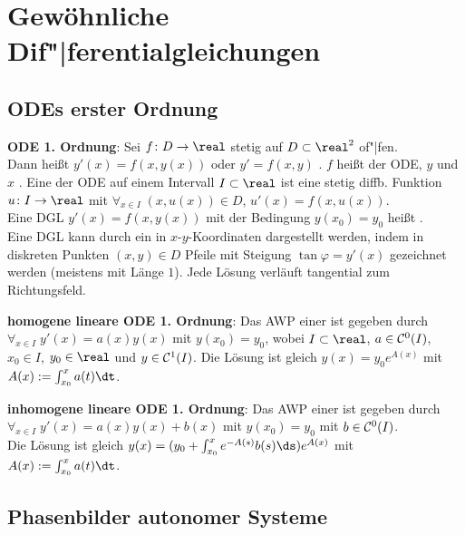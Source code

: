 \section{%
    Gewöhnliche Dif"|ferentialgleichungen%
}

\subsection{%
    ODEs erster Ordnung%
}

\textbf{ODE 1. Ordnung}:
Sei $f\colon D \to \real$ stetig auf $D \subset \real^2$ of"|fen.\\
Dann heißt $y'(x) = f(x, y(x))$ oder $y' = f(x, y)$ .
$f$ heißt  der ODE,
$y$  und $x$ .
Eine  der ODE auf einem Intervall $I \subset \real$ ist eine
stetig diffb. Funktion $u\colon I \to \real$ mit
$\forall_{x \in I}\; (x, u(x)) \in D$, $u'(x) = f(x, u(x))$.\\
Eine DGL $y'(x) = f(x, y(x))$ mit der Bedingung $y(x_0) = y_0$ heißt
.\\
Eine DGL kann durch ein  in $x$-$y$-Koordinaten dargestellt werden,
indem in diskreten Punkten $(x, y) \in D$ Pfeile mit Steigung $\tan \varphi = y'(x)$
gezeichnet werden (meistens mit Länge $1$).
Jede Lösung verläuft tangential zum Richtungsfeld.

\linie

\textbf{homogene lineare ODE 1. Ordnung}:
Das AWP einer  ist gegeben durch
$\forall_{x \in I}\; y'(x) = a(x) y(x)$ mit $y(x_0) = y_0$,
wobei $I \subset \real$, $a \in \mathcal{C}^0(I)$,
$x_0 \in I$, $y_0 \in \real$ und $y \in \mathcal{C}^1(I)$.
Die Lösung ist gleich $y(x) = y_0 e^{A(x)}$ mit $A(x) := \int_{x_0}^x a(t) \dt$.

\textbf{inhomogene lineare ODE 1. Ordnung}:
Das AWP einer  ist gegeben durch
$\forall_{x \in I}\; y'(x) = a(x) y(x) + b(x)$ mit $y(x_0) = y_0$
mit $b \in \mathcal{C}^0(I)$.\\
Die Lösung ist gleich $y(x) = (y_0 + \int_{x_0}^x e^{-A(s)} b(s) \ds) e^{A(x)}$
mit $A(x) := \int_{x_0}^x a(t) \dt$.

\subsection{%
    Phasenbilder autonomer Systeme%
}

